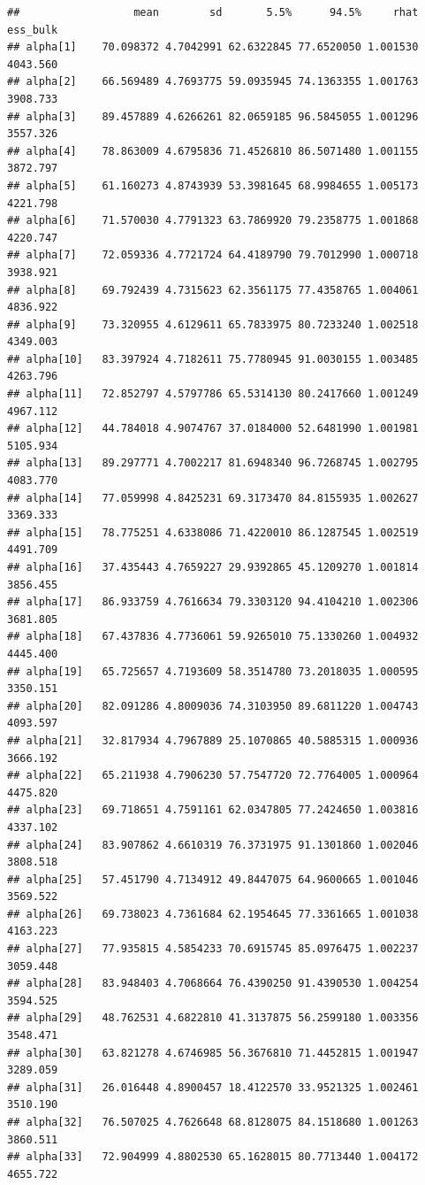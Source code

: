 \documentclass[
]{article}
\begin{document}
\begin{verbatim}
##                  mean        sd       5.5%      94.5%     rhat ess_bulk
## alpha[1]    70.098372 4.7042991 62.6322845 77.6520050 1.001530 4043.560
## alpha[2]    66.569489 4.7693775 59.0935945 74.1363355 1.001763 3908.733
## alpha[3]    89.457889 4.6266261 82.0659185 96.5845055 1.001296 3557.326
## alpha[4]    78.863009 4.6795836 71.4526810 86.5071480 1.001155 3872.797
## alpha[5]    61.160273 4.8743939 53.3981645 68.9984655 1.005173 4221.798
## alpha[6]    71.570030 4.7791323 63.7869920 79.2358775 1.001868 4220.747
## alpha[7]    72.059336 4.7721724 64.4189790 79.7012990 1.000718 3938.921
## alpha[8]    69.792439 4.7315623 62.3561175 77.4358765 1.004061 4836.922
## alpha[9]    73.320955 4.6129611 65.7833975 80.7233240 1.002518 4349.003
## alpha[10]   83.397924 4.7182611 75.7780945 91.0030155 1.003485 4263.796
## alpha[11]   72.852797 4.5797786 65.5314130 80.2417660 1.001249 4967.112
## alpha[12]   44.784018 4.9074767 37.0184000 52.6481990 1.001981 5105.934
## alpha[13]   89.297771 4.7002217 81.6948340 96.7268745 1.002795 4083.770
## alpha[14]   77.059998 4.8425231 69.3173470 84.8155935 1.002627 3369.333
## alpha[15]   78.775251 4.6338086 71.4220010 86.1287545 1.002519 4491.709
## alpha[16]   37.435443 4.7659227 29.9392865 45.1209270 1.001814 3856.455
## alpha[17]   86.933759 4.7616634 79.3303120 94.4104210 1.002306 3681.805
## alpha[18]   67.437836 4.7736061 59.9265010 75.1330260 1.004932 4445.400
## alpha[19]   65.725657 4.7193609 58.3514780 73.2018035 1.000595 3350.151
## alpha[20]   82.091286 4.8009036 74.3103950 89.6811220 1.004743 4093.597
## alpha[21]   32.817934 4.7967889 25.1070865 40.5885315 1.000936 3666.192
## alpha[22]   65.211938 4.7906230 57.7547720 72.7764005 1.000964 4475.820
## alpha[23]   69.718651 4.7591161 62.0347805 77.2424650 1.003816 4337.102
## alpha[24]   83.907862 4.6610319 76.3731975 91.1301860 1.002046 3808.518
## alpha[25]   57.451790 4.7134912 49.8447075 64.9600665 1.001046 3569.522
## alpha[26]   69.738023 4.7361684 62.1954645 77.3361665 1.001038 4163.223
## alpha[27]   77.935815 4.5854233 70.6915745 85.0976475 1.002237 3059.448
## alpha[28]   83.948403 4.7068664 76.4390250 91.4390530 1.004254 3594.525
## alpha[29]   48.762531 4.6822810 41.3137875 56.2599180 1.003356 3548.471
## alpha[30]   63.821278 4.6746985 56.3676810 71.4452815 1.001947 3289.059
## alpha[31]   26.016448 4.8900457 18.4122570 33.9521325 1.002461 3510.190
## alpha[32]   76.507025 4.7626648 68.8128075 84.1518680 1.001263 3860.511
## alpha[33]   72.904999 4.8802530 65.1628015 80.7713440 1.004172 4655.722

\end{verbatim}
\end{document}
